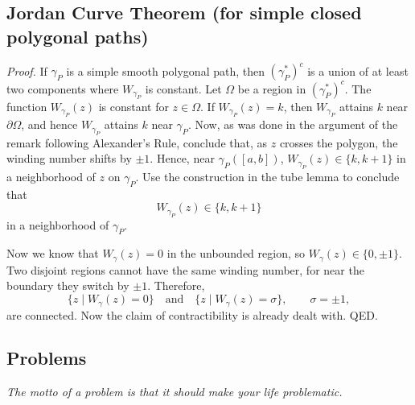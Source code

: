 \documentclass[11pt,a4paper]{article}
\begin{document}
\subsection*{Jordan Curve Theorem (for simple closed polygonal paths)}
\textit{Proof.}
If \(\gamma_P\) is a simple smooth polygonal path, then \((\gamma_P^*)^c\) is a union of at least two components where \(W_{\gamma_P}\) is constant. Let \(\Omega\) be a region in \((\gamma_P^*)^c\). The function \(W_{\gamma_P}(z)\) is constant for \(z\in\Omega\). If \(W_{\gamma_P}(z)=k\), then \(W_{\gamma_P}\) attains \(k\) near \(\partial\Omega\), and hence \(W_{\gamma_P}\) attains \(k\) near \(\gamma_P\). Now, as was done in the argument of the remark following Alexander's Rule, conclude that, as \(z\) crosses the polygon, the winding number shifts by \(\pm1\). Hence, near \(\gamma_P([a,b])\), \(W_{\gamma_P}(z)\in\{k,k+1\}\)
in a neighborhood of \(z\) on \(\gamma_P\). Use the construction in the tube lemma to conclude that
\[
  W_{\gamma_P}(z)\in\{k,k+1\}
\]
in a neighborhood of \(\gamma_P\).


Now we know that \(W_\gamma(z)=0\) in the unbounded region, so \(W_\gamma(z)\in\{0,\pm1\}.\)
Two disjoint regions cannot have the same winding number, for near the boundary they switch by \(\pm1\). Therefore,
\[
  \{z\mid W_\gamma(z)=0\}
  \quad\text{and}\quad
  \{z\mid W_\gamma(z)=\sigma\},
  \qquad \sigma=\pm1,
\]
are connected. Now the claim of contractibility is already dealt with. QED.


\subsection*{Problems}
\emph{The motto of a problem is that it should make your life problematic.}
\end{document}

